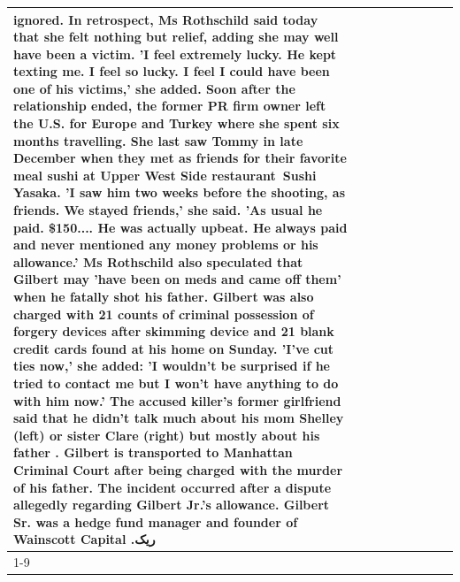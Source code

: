 \begin{table}[H]
\begin{tabular}{lllrlllll}
ignored. In retrospect, Ms Rothschild said today that she felt nothing but relief, adding she may well have been a victim. 'I feel extremely lucky. He kept texting me. I feel so lucky. I feel I could have been one of his victims,' she added. Soon after the relationship ended, the former PR firm owner left the U.S. for Europe and Turkey where she spent six months  travelling. She last saw Tommy in late December when they met as friends for their favorite meal sushi at Upper West Side restaurant Sushi Yasaka. 'I saw him two weeks before the shooting, as friends. We stayed friends,' she said. 'As usual he paid. \$150.... He was actually upbeat. He always paid and never mentioned any money problems or his allowance.' Ms Rothschild also speculated that Gilbert may 'have been on meds and came off them' when he fatally shot his father. Gilbert was also charged with 21 counts of criminal possession of forgery devices after skimming device and 21 blank credit cards found at his home on Sunday. 'I've cut ties now,' she added: 'I wouldn’t be surprised if he tried to contact me but I won’t have anything to do with him now.' The accused killer's former girlfriend said that he didn't talk much about his mom Shelley (left) or sister Clare (right) but mostly about his father . Gilbert is transported to Manhattan Criminal Court  after being charged with the murder of his father. The incident occurred after a dispute allegedly regarding Gilbert Jr.'s allowance. Gilbert Sr. was a hedge fund manager and founder of Wainscott Capital .ریک \\
\cline{1-9}

\end{tabular}
\end{table}
